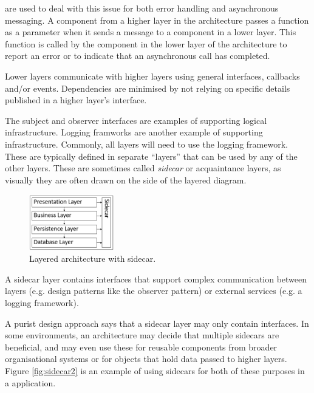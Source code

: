 are used to deal with this issue for both error handling and asynchronous messaging.
A component from a higher layer in the architecture passes a function as a parameter when it sends a message to a component in a lower layer.
This function is called by the component in the lower layer of the architecture to report an error
or to indicate that an asynchronous call has completed.

\begin{definition}
    Lower layers communicate with higher layers using general interfaces, callbacks and/or events.
    Dependencies are minimised by not relying on specific details published in a higher layer's interface.
\end{definition}

The subject and observer interfaces are examples of supporting logical infrastructure.
Logging framworks are another example of supporting infrastructure.
Commonly, all layers will need to use the logging framework.
These are typically defined in separate ``layers'' that can be used by any of the other layers.
These are sometimes called \emph{sidecar} or acquaintance layers, as visually they are often drawn on the side of the layered diagram.

\begin{figure}[h]
  \begin{center}
    \includegraphics[width=0.33\textwidth]{images/layered_with_sidecar.png}
  \end{center}
  \caption{Layered architecture with sidecar.}
\end{figure}

\begin{definition}
    A sidecar layer contains interfaces that support complex communication between layers
    (e.g. design patterns like the observer pattern) or external services (e.g. a logging framework).
\end{definition}

A purist design approach says that a sidecar layer may only contain interfaces.
In some environments, an architecture may decide that multiple sidecars are beneficial,
and may even use these for reusable components from broader organisational systems
or for objects that hold data passed to higher layers.
Figure \ref{fig:sidecar2} is an example of using sidecars for both of these purposes in a
 application.


